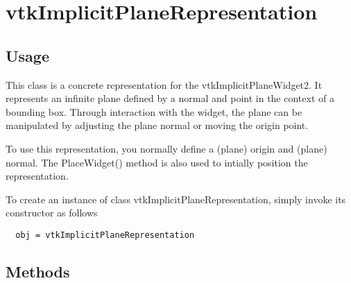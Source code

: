 \section{vtkImplicitPlaneRepresentation}

\subsection{Usage}

 This class is a concrete representation for the
 vtkImplicitPlaneWidget2. It represents an infinite plane defined by a
 normal and point in the context of a bounding box. Through interaction
 with the widget, the plane can be manipulated by adjusting the plane
 normal or moving the origin point.

 To use this representation, you normally define a (plane) origin and (plane)
 normal. The PlaceWidget() method is also used to intially position the
 representation.

To create an instance of class vtkImplicitPlaneRepresentation, simply
invoke its constructor as follows
\begin{verbatim}
  obj = vtkImplicitPlaneRepresentation
\end{verbatim}
\subsection{Methods}


